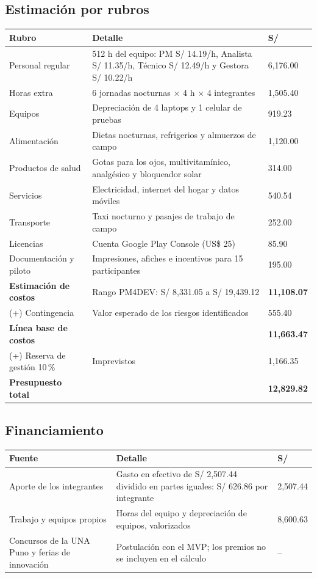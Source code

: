 \documentclass[11pt,a4paper]{article}
\begin{document}
\subsection{Estimación por rubros}
{\small
\noindent\begin{tabularx}{\textwidth}{@{}P{3.6cm} L Q{2.0cm}@{}}
\toprule
{}
\textbf{Rubro} & \textbf{Detalle} & \textbf{S/} \\
\midrule
Personal regular & 512 h del equipo: PM S/ 14.19/h, Analista S/ 11.35/h, Técnico S/ 12.49/h y Gestora S/ 10.22/h & 6,176.00 \\
Horas extra & 6 jornadas nocturnas $\times$ 4 h $\times$ 4 integrantes & 1,505.40 \\
Equipos & Depreciación de 4 laptops y 1 celular de pruebas & 919.23 \\
Alimentación & Dietas nocturnas, refrigerios y almuerzos de campo & 1,120.00 \\
Productos de salud & Gotas para los ojos, multivitamínico, analgésico y bloqueador solar & 314.00 \\
Servicios & Electricidad, internet del hogar y datos móviles & 540.54 \\
Transporte & Taxi nocturno y pasajes de trabajo de campo & 252.00 \\
Licencias & Cuenta Google Play Console (US\$ 25) & 85.90 \\
Documentación y piloto & Impresiones, afiches e incentivos para 15 participantes & 195.00 \\
\midrule
\textbf{Estimación de costos} & Rango PM4DEV: S/ 8,331.05 a S/ 19,439.12 & \textbf{11,108.07} \\
(+) Contingencia & Valor esperado de los riesgos identificados & 555.40 \\
\textbf{Línea base de costos} & & \textbf{11,663.47} \\
(+) Reserva de gestión 10\,\% & Imprevistos & 1,166.35 \\
\textbf{Presupuesto total} & & \textbf{12,829.82} \\
\bottomrule
\end{tabularx}
}

\subsection{Financiamiento}
{\small
\noindent\begin{tabularx}{\textwidth}{@{}P{4.2cm} L Q{2.0cm}@{}}
\toprule
{}
\textbf{Fuente} & \textbf{Detalle} & \textbf{S/} \\
\midrule
Aporte de los integrantes & Gasto en efectivo de S/ 2,507.44 dividido en partes iguales: S/ 626.86 por integrante & 2,507.44 \\
Trabajo y equipos propios & Horas del equipo y depreciación de equipos, valorizados & 8,600.63 \\
Concursos de la UNA Puno y ferias de innovación & Postulación con el MVP; los premios no se incluyen en el cálculo & -- \\
\bottomrule
\end{tabularx}
}
\end{document}
